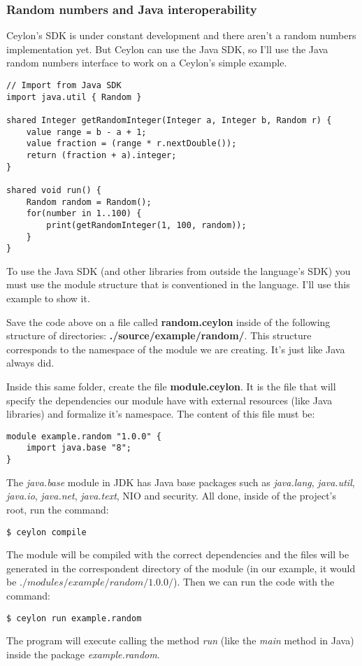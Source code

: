 \subsubsection{Random numbers and Java interoperability}

Ceylon's SDK is under constant development\cite{1_8} and there aren't a random
numbers implementation yet. But Ceylon can use the Java SDK, so I'll use the
Java random numbers interface to work on a Ceylon's simple example.

\begin{lstlisting}[label=w1,caption=Random number from Java]
// Import from Java SDK
import java.util { Random }

shared Integer getRandomInteger(Integer a, Integer b, Random r) {
	value range = b - a + 1;
	value fraction = (range * r.nextDouble());
	return (fraction + a).integer;
}

shared void run() {
    Random random = Random();
    for(number in 1..100) {
        print(getRandomInteger(1, 100, random));
    }
}
\end{lstlisting}

To use the Java SDK (and other libraries from outside the language's SDK) you
must use the module structure that is conventioned in the language. I'll use
this example to show it.

Save the code above on a file called \textbf{random.ceylon} inside of the
following structure of directories: \textbf{./source/example/random/}. This
structure corresponds to the namespace of the module we are creating. It's just
like Java always did.

Inside this same folder, create the file \textbf{module.ceylon}. It is the file
that will specify the dependencies our module have with external resources (like
Java libraries) and formalize it's namespace. The content of this file must be:

\begin{lstlisting}
module example.random "1.0.0" {
    import java.base "8";
}
\end{lstlisting}

The \textit{java.base} module in JDK has Java base packages such as
\textit{java.lang}, \textit{java.util}, \textit{java.io}, \textit{java.net},
\textit {java.text}, NIO and security\cite{1_9}. All done, inside of the
project's root, run the command:

\begin{verbatim}
$ ceylon compile
\end{verbatim}

The module will be compiled with the correct dependencies and the files will be
generated in the correspondent directory of the module (in our example, it
would be $./modules/example/random/1.0.0/$). Then we can run the code
with the command:

\begin{verbatim}
$ ceylon run example.random
\end{verbatim}

The program will execute calling the method \textit{run} (like the \textit{main}
method in Java) inside the package \textit{example.random}.